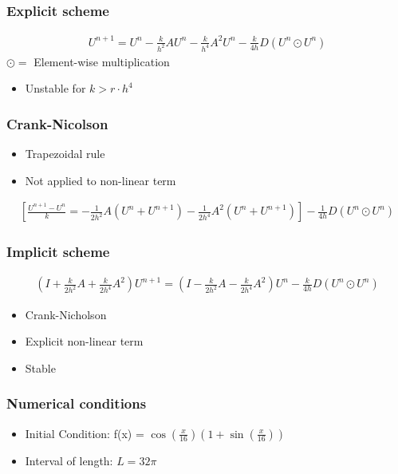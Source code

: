 \documentclass[screen]{beamer}
\begin{document}
\begin{frame}
\frametitle{Explicit scheme}
\flushright

\begin{align*}
U^{n+1} = U^n - \frac{k}{h^2}AU^n - \frac{k}{h^4}A^2U^n - \frac{k}{4h}D(U^{n}\odot U^n)
\end{align*}
$\odot =$ Element-wise multiplication
\begin{itemize}
\item Unstable for $k > r \cdot h^4$

\end{itemize}
\end{frame}


\begin{frame}
\frametitle{Crank-Nicolson}
\begin{itemize}
\normalsize
\item Trapezoidal rule
\item Not applied to non-linear term
\end{itemize}
\small
\begin{align*}
 \left[\frac{U^{n+1} - U^n}{k} =
- \frac{1}{2h^2}A(U^n+U^{n+1}) - \frac{1}{2h^4}A^2(U^n + U^{n+1}) \right] - \frac{1}{4h}D(U^{n}\odot U^n)
\end{align*}

\end{frame}


\begin{frame}
\frametitle{Implicit scheme}
\begin{align*}
(I + \frac{k}{2h^2}A + \frac{k}{2h^4}A^2)U^{n+1}
= (I - \frac{k}{2h^2}A - \frac{k}{2h^4}A^2)U^n - \frac{k}{4h}D(U^{n}\odot U^n)
\end{align*}

\begin{itemize}
\item Crank-Nicholson
\item Explicit non-linear term
\item Stable
\end{itemize}

\end{frame}

\begin{frame}
\frametitle{Numerical conditions}
\begin{itemize}
\item Initial Condition: f(x) = $\cos(\frac{x}{16})(1+\sin(\frac{x}{16}))$
\item Interval of length: $L = 32\pi$
\end{itemize}
\end{frame}
\end{document}
